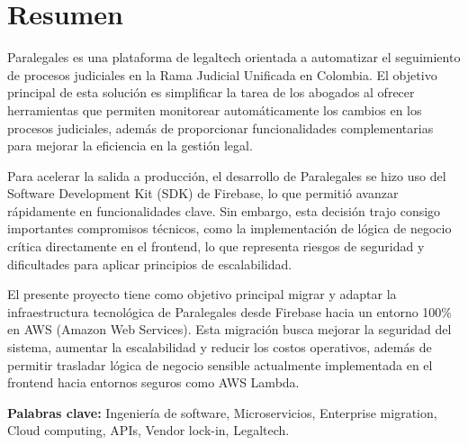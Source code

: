 \newpage
\section*{Resumen}

Paralegales es una plataforma de legaltech orientada a automatizar el seguimiento de procesos judiciales en la Rama Judicial Unificada en Colombia. El objetivo principal de esta solución es simplificar la tarea de los abogados al ofrecer herramientas que permiten monitorear automáticamente los cambios en los procesos judiciales, además de proporcionar funcionalidades complementarias para mejorar la eficiencia en la gestión legal.

Para acelerar la salida a producción, el desarrollo de Paralegales se hizo uso del Software Development Kit (SDK) de Firebase, lo que permitió avanzar rápidamente en funcionalidades clave. Sin embargo, esta decisión trajo consigo importantes compromisos técnicos, como la implementación de lógica de negocio crítica directamente en el frontend, lo que representa riesgos de seguridad y dificultades para aplicar principios de escalabilidad.

El presente proyecto tiene como objetivo principal migrar y adaptar la infraestructura tecnológica de Paralegales desde Firebase hacia un entorno 100\% en AWS (Amazon Web Services). Esta migración busca mejorar la seguridad del sistema, aumentar la escalabilidad y reducir los costos operativos, además de permitir trasladar lógica de negocio sensible actualmente implementada en el frontend hacia entornos seguros como AWS Lambda.

\hfill

\textbf{Palabras clave:}  Ingeniería de software, Microservicios, Enterprise migration, Cloud computing, APIs, Vendor lock-in, Legaltech.
